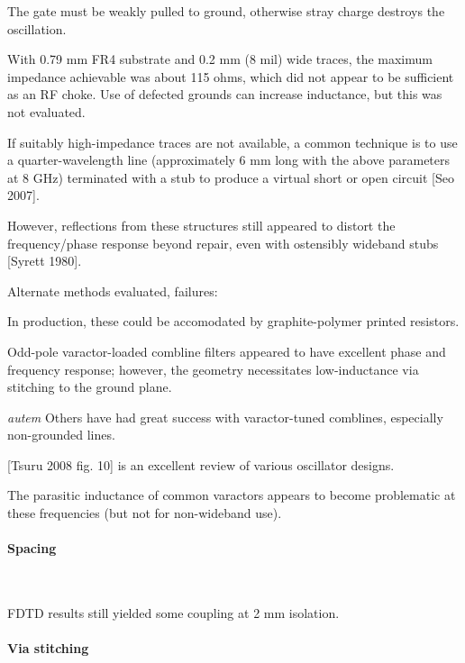 \documentclass[paper.tex]{subfiles}
\begin{document}
The gate must be weakly pulled to ground, otherwise stray charge destroys the oscillation.




With 0.79 mm FR4 substrate and 0.2 mm (8 mil) wide traces, the maximum impedance achievable was about 115 ohms, which did not appear to be sufficient as an RF choke. Use of defected grounds can increase inductance, but this was not evaluated.

If suitably high-impedance traces are not available, a common technique is to use a quarter-wavelength line (approximately 6 mm long with the above parameters at 8 GHz) terminated with a stub to produce a virtual short or open circuit [Seo 2007]. 

However, reflections from these structures still appeared to distort the frequency/phase response beyond repair, even with ostensibly wideband stubs [Syrett 1980].

\noindent{}

Alternate methods evaluated, failures: 


In production, these could be accomodated by graphite-polymer printed resistors. 


Odd-pole varactor-loaded combline filters appeared to have excellent phase and frequency response; however, the geometry necessitates low-inductance via stitching to the ground plane.

\begin{autem}
	{\it autem} Others have had great success with varactor-tuned comblines, especially non-grounded lines.
\end{autem}

[Tsuru 2008 fig. 10] is an excellent review of various oscillator designs.

The parasitic inductance of common varactors appears to become problematic at these frequencies (but not for non-wideband use).

\paragraph{\textbf{Spacing}}\

FDTD results still yielded some coupling at 2 mm isolation.

\paragraph{\textbf{Via stitching}}\
\end{document}
